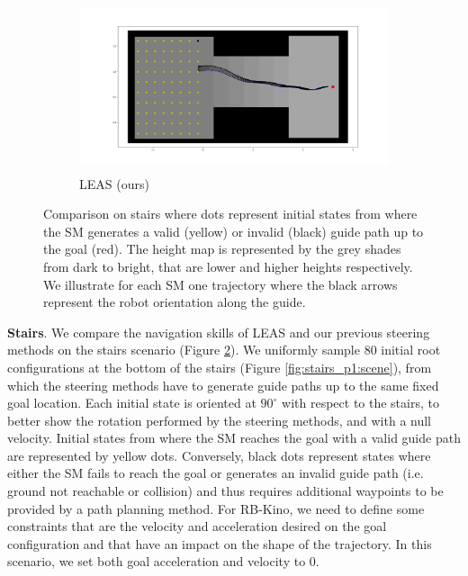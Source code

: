 \begin{figure}[ht]
\begin{subfigure}[t]{0.49\linewidth}
    \end{subfigure}
    \begin{subfigure}[t]{0.49\linewidth}
    \includegraphics[width=\textwidth, height=5cm,trim={2cm 2cm 2cm 2cm},clip]{Figures/Chapter_LEAS/stairs_leas_p1_90.png}
    \caption{LEAS (ours)}
    \label{fig:leas:stairs_p1_leas}
    \end{subfigure}
    \caption{Comparison on stairs where dots represent initial states from where the SM generates a valid (yellow) or invalid (black) guide path up to the goal (red). 
    The height map is represented by the grey shades from dark to bright, that are lower and higher heights respectively.
    We illustrate for each SM one trajectory where the black arrows represent the robot orientation along the guide.}
    \label{fig:stairs_p1}
\end{figure}

\hfill

\noindent\textbf{Stairs}. We compare the navigation skills of LEAS and our previous steering methods on the stairs scenario (Figure \ref{fig:stairs_p1}). 
We uniformly sample 80 initial root configurations at the bottom of the stairs (Figure \ref{fig:stairs_p1:scene}), from which the steering methods have to generate guide paths up to the same fixed goal location.
Each initial state is oriented at $90^{\circ}$ with respect to the stairs, to better show the rotation performed by the steering methods, and with a null velocity. 
Initial states from where the SM reaches the goal with a valid guide path are represented by yellow dots. Conversely, black dots represent states where either the SM fails to reach the goal or generates an invalid guide path (i.e. ground not reachable or collision) and thus requires additional waypoints to be provided by a path planning method. 
For RB-Kino, we need to define some constraints that are the velocity and acceleration desired on the goal configuration and that have an impact on the shape of the trajectory. In this scenario, we set both goal acceleration and velocity to $0$.

